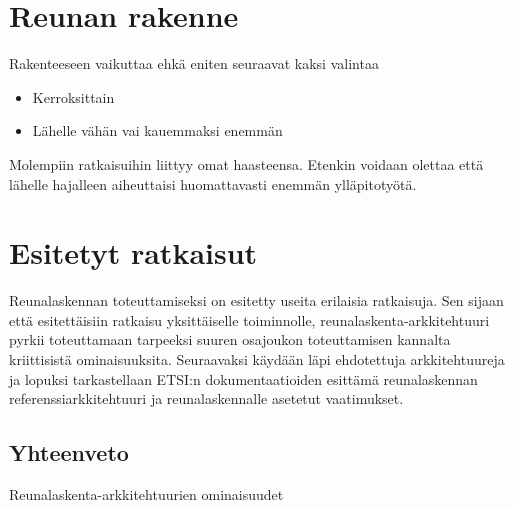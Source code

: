 \documentclass[finnish]{tktltiki2}
\theoremstyle{definition}
\theoremstyle{remark}
\begin{document}






\section{Reunan rakenne}
Rakenteeseen vaikuttaa ehkä eniten seuraavat kaksi valintaa
\begin{itemize}
\item Kerroksittain
\item Lähelle vähän vai kauemmaksi enemmän
\end{itemize}
Molempiin ratkaisuihin liittyy omat haasteensa. Etenkin voidaan olettaa että lähelle hajalleen aiheuttaisi huomattavasti enemmän ylläpitotyötä.
\cite{mao17} 

\section{Esitetyt ratkaisut}
Reunalaskennan toteuttamiseksi on esitetty useita erilaisia ratkaisuja.
Sen sijaan että esitettäisiin ratkaisu yksittäiselle toiminnolle, reunalaskenta-arkkitehtuuri pyrkii toteuttamaan tarpeeksi suuren osajoukon toteuttamisen kannalta kriittisistä ominaisuuksita.
Seuraavaksi käydään läpi ehdotettuja arkkitehtuureja ja lopuksi tarkastellaan ETSI:n
dokumentaatioiden esittämä reunalaskennan referenssiarkkitehtuuri ja
reunalaskennalle asetetut vaatimukset.







 






\subsection{Yhteenveto}


\begin{table}
	\caption{Reunalaskenta-arkkitehtuurien ominaisuudet}
	\label{table:features}
	
\end{table}
 




\lastpage



% 
\end{document}
